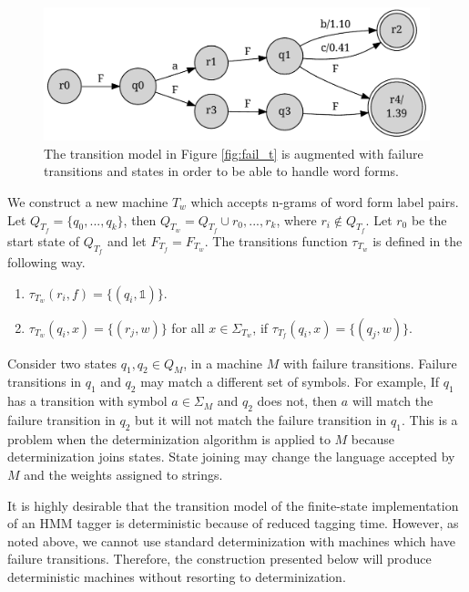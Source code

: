 \begin{figure}[!htb]
\begin{center}
\includegraphics[scale=0.5]{fail_t_wf}
\caption{The transition model in Figure \ref{fig:fail_t} is augmented
  with failure transitions and states in order to be able to handle
  word forms.}\label{fig:fail_t_wf}
\end{center}
\end{figure}

We construct a new machine $T_w$ which accepts n-grams of word
form label pairs. Let $Q_{T_f} = \{q_0, ..., q_k\}$, then $Q_{T_w} =
Q_{T_f} \cup {r_0, ..., r_k}$, where $r_i \notin Q_{T_f}$. Let $r_0$
be the start state of $Q_{T_f}$ and let $F_{T_f} = F_{T_w}$. The
transitions function $\tau_{T_w}$ is defined in the following way.

\begin{enumerate}
\item $\tau_{T_w}(r_i,f) = \{(q_i,\mathbb{1})\}$.
\item $\tau_{T_w}(q_i,x) = \{(r_j,w)\}$ for all $x \in \Sigma_{T_w}$, if $\tau_{T_f}(q_i,x) = \{(q_j,w)\}$.
\end{enumerate}

Consider two states $q_1,q_2 \in Q_M$, in a machine $M$ with failure
transitions. Failure transitions in $q_1$ and $q_2$ may match a
different set of symbols. For example, If $q_1$ has a transition with
symbol $a \in \Sigma_M$ and $q_2$ does not, then $a$ will match the
failure transition in $q_2$ but it will not match the failure
transition in $q_1$. This is a problem when the determinization
algorithm is applied to $M$ because determinization joins states.
State joining may change the language accepted by $M$ and the
weights assigned to strings. 

It is highly desirable that the transition model of the finite-state
implementation of an HMM tagger is deterministic because of reduced
tagging time. However, as noted above, we cannot use standard
determinization with machines which have failure
transitions. Therefore, the construction presented below will produce
deterministic machines without resorting to determinization.

